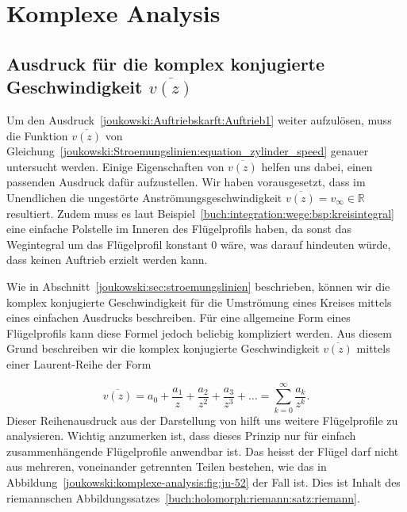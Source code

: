 \section{Komplexe Analysis}
\label{joukowski:sec:komplexe-analysis}

\subsection{Ausdruck für die komplex konjugierte Geschwindigkeit $\overline{v(z)}$}
Um den Ausdruck~\eqref{joukowski:Auftriebskarft:Auftrieb1} weiter aufzulösen, muss die Funktion $\overline{v(z)}$ von Gleichung~\eqref{joukowski:Stroemungslinien:equation_zylinder_speed}
genauer untersucht werden.
Einige Eigenschaften von $\overline{v(z)}$ helfen uns dabei, einen passenden Ausdruck dafür aufzustellen.
Wir haben vorausgesetzt, dass im Unendlichen die ungestörte Anströmungsgeschwindigkeit $\overline{v(z)} = v_\infty \in \mathbb{R}$ resultiert.
Zudem muss es laut Beispiel~\ref{buch:integration:wege:bsp:kreisintegral} eine einfache Polstelle im Inneren des Flügelprofils haben,
da sonst das Wegintegral um das Flügelprofil konstant $0$ wäre,
was darauf hindeuten würde, dass keinen Auftrieb erzielt werden kann.

Wie in Abschnitt~\ref{joukowski:sec:stroemungslinien} beschrieben,
können wir die komplex konjugierte Geschwindigkeit für die Umströmung eines Kreises mittels eines einfachen Ausdrucks beschreiben.
Für eine allgemeine Form eines Flügelprofils kann diese Formel jedoch beliebig kompliziert werden.
Aus diesem Grund beschreiben wir die komplex konjugierte Geschwindigkeit $\overline{v(z)}$ mittels einer Laurent-Reihe der Form

\begin{equation}
	\overline{v(z)} 
	= 
	a_0 + \frac{a_1}{z} + \frac{a_2}{z^2} + \frac{a_3}{z^3} + \dots 
	= 
	\sum_{k=0}^{\infty} \frac{a_k}{z^k}.
	\label{joukowski:komplexe-analysis:original-laurent-reihe}
\end{equation}
Dieser Reihenausdruck aus der Darstellung von \cite{joukowski:smirnov} hilft uns weitere Flügelprofile zu analysieren.
Wichtig anzumerken ist, dass dieses Prinzip nur für einfach zusammenhängende Flügelprofile anwendbar ist.
Das heisst der Flügel darf nicht aus mehreren, voneinander getrennten Teilen bestehen, wie das in Abbildung~\ref{joukowski:komplexe-analysis:fig:ju-52} der Fall ist.
Dies ist Inhalt des riemannschen Abbildungssatzes~\ref{buch:holomorph:riemann:satz:riemann}.

%
%

